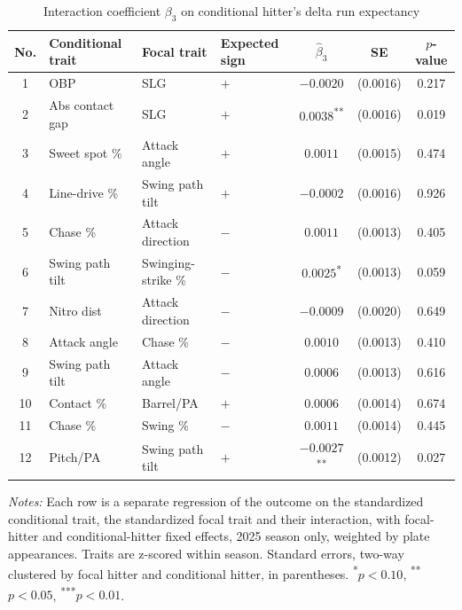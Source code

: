 \begin{table}[htbp]
\centering
\small
\caption{Interaction coefficient $\beta_3$ on conditional hitter's delta run expectancy}
\label{tab:table1_cond_2025}
\begin{tabular}{clllccc}
\toprule
No. & Conditional trait & Focal trait & Expected sign & $\hat\beta_3$ & SE & $p$-value \\
\midrule
1 & OBP & SLG & $+$ & $-0.0020$ & (0.0016) & 0.217 \\
2 & Abs contact gap & SLG & $+$ & $0.0038$\textsuperscript{**} & (0.0016) & 0.019 \\
3 & Sweet spot \% & Attack angle & $+$ & $0.0011$ & (0.0015) & 0.474 \\
4 & Line-drive \% & Swing path tilt & $+$ & $-0.0002$ & (0.0016) & 0.926 \\
5 & Chase \% & Attack direction & $-$ & $0.0011$ & (0.0013) & 0.405 \\
6 & Swing path tilt & Swinging-strike \% & $-$ & $0.0025$\textsuperscript{*} & (0.0013) & 0.059 \\
7 & Nitro dist & Attack direction & $-$ & $-0.0009$ & (0.0020) & 0.649 \\
8 & Attack angle & Chase \% & $-$ & $0.0010$ & (0.0013) & 0.410 \\
9 & Swing path tilt & Attack angle & $-$ & $0.0006$ & (0.0013) & 0.616 \\
10 & Contact \% & Barrel/PA & $+$ & $0.0006$ & (0.0014) & 0.674 \\
11 & Chase \% & Swing \% & $-$ & $0.0011$ & (0.0014) & 0.445 \\
12 & Pitch/PA & Swing path tilt & $+$ & $-0.0027$\textsuperscript{**} & (0.0012) & 0.027 \\
\bottomrule
\end{tabular}
\par\smallskip\parbox{0.95\textwidth}{\footnotesize \textit{Notes:} Each row is a separate regression of the outcome on the standardized conditional trait, the standardized focal trait and their interaction, with focal-hitter and conditional-hitter fixed effects, 2025 season only, weighted by plate appearances. Traits are z-scored within season. Standard errors, two-way clustered by focal hitter and conditional hitter, in parentheses. \textsuperscript{*}$p<0.10$, \textsuperscript{**}$p<0.05$, \textsuperscript{***}$p<0.01$.}
\end{table}
